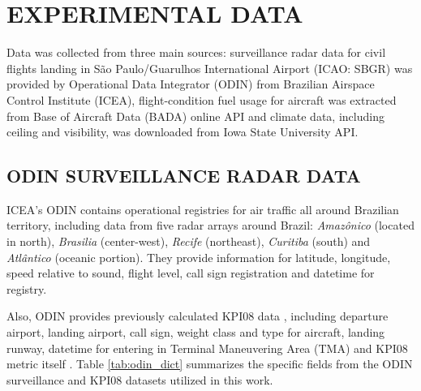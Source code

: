 \section{EXPERIMENTAL DATA}
\label{sec:experimental_data}
Data was collected from three main sources: surveillance radar data  for civil flights landing in São Paulo/Guarulhos International Airport (ICAO: SBGR) was provided by Operational Data Integrator (ODIN) from Brazilian Airspace Control Institute (ICEA), flight-condition fuel usage for aircraft was extracted from Base of Aircraft Data (BADA) online API \cite{bada_a320} and climate data, including ceiling and visibility, was downloaded from Iowa State University API.

\subsection{ODIN SURVEILLANCE RADAR DATA}
ICEA's ODIN contains operational registries for air traffic all around Brazilian territory, including data from five radar arrays around Brazil: \textit{Amazônico} (located in north), \textit{Brasilia} (center-west), \textit{Recife} (northeast), \textit{Curitiba} (south) and \textit{Atlântico} (oceanic portion). They provide information for latitude, longitude, speed relative to sound, flight level, call sign registration and datetime for registry.

Also, ODIN provides previously calculated KPI08 data \cite{mca10022}, including departure airport, landing airport, call sign, weight class and type for aircraft, landing runway, datetime for entering in Terminal Maneuvering Area (TMA) and KPI08 metric itself \cite{doc9750}. Table \ref{tab:odin_dict} summarizes the specific fields from the ODIN surveillance and KPI08 datasets utilized in this work.

